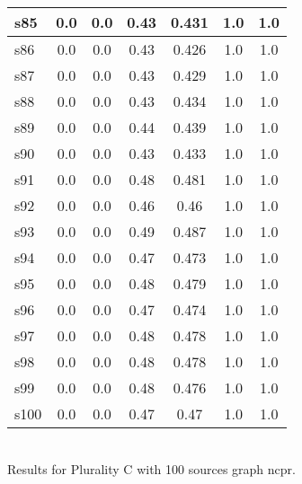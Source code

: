\documentclass{article}
\begin{document}
\begin{tabular}{|l|c|c|c|c|c|c|}
\hline
s85 &0.0 & 0.0 & 0.43 & 0.431 & 1.0 & 1.0\\
\hline
s86 &0.0 & 0.0 & 0.43 & 0.426 & 1.0 & 1.0\\
\hline
s87 &0.0 & 0.0 & 0.43 & 0.429 & 1.0 & 1.0\\
\hline
s88 &0.0 & 0.0 & 0.43 & 0.434 & 1.0 & 1.0\\
\hline
s89 &0.0 & 0.0 & 0.44 & 0.439 & 1.0 & 1.0\\
\hline
s90 &0.0 & 0.0 & 0.43 & 0.433 & 1.0 & 1.0\\
\hline
s91 &0.0 & 0.0 & 0.48 & 0.481 & 1.0 & 1.0\\
\hline
s92 &0.0 & 0.0 & 0.46 & 0.46 & 1.0 & 1.0\\
\hline
s93 &0.0 & 0.0 & 0.49 & 0.487 & 1.0 & 1.0\\
\hline
s94 &0.0 & 0.0 & 0.47 & 0.473 & 1.0 & 1.0\\
\hline
s95 &0.0 & 0.0 & 0.48 & 0.479 & 1.0 & 1.0\\
\hline
s96 &0.0 & 0.0 & 0.47 & 0.474 & 1.0 & 1.0\\
\hline
s97 &0.0 & 0.0 & 0.48 & 0.478 & 1.0 & 1.0\\
\hline
s98 &0.0 & 0.0 & 0.48 & 0.478 & 1.0 & 1.0\\
\hline
s99 &0.0 & 0.0 & 0.48 & 0.476 & 1.0 & 1.0\\
\hline
s100 &0.0 & 0.0 & 0.47 & 0.47 & 1.0 & 1.0\\
\hline
\end{tabular}\\

\noindent Results for Plurality C with 100 sources graph ncpr.
\end{document}
